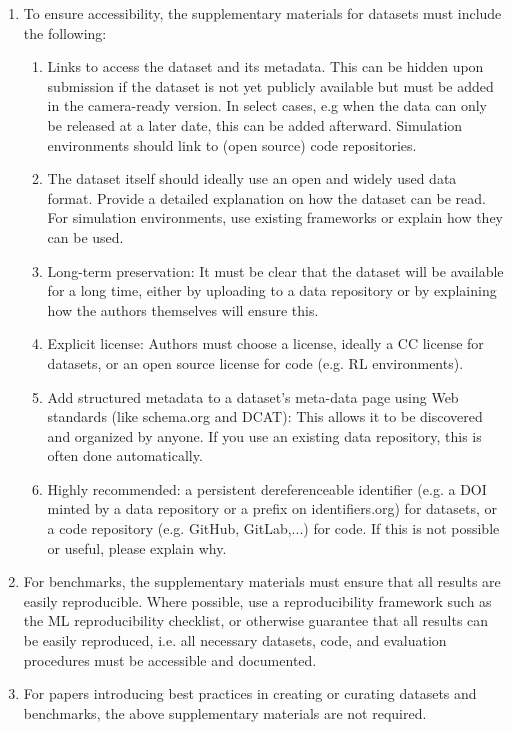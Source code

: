 \begin{enumerate}
\item To ensure accessibility, the supplementary materials for datasets must include the following:
\begin{enumerate}
  \item Links to access the dataset and its metadata. This can be hidden upon submission if the dataset is not yet publicly available but must be added in the camera-ready version. In select cases, e.g when the data can only be released at a later date, this can be added afterward. Simulation environments should link to (open source) code repositories.
  \item The dataset itself should ideally use an open and widely used data format. Provide a detailed explanation on how the dataset can be read. For simulation environments, use existing frameworks or explain how they can be used.
  \item Long-term preservation: It must be clear that the dataset will be available for a long time, either by uploading to a data repository or by explaining how the authors themselves will ensure this.
  \item Explicit license: Authors must choose a license, ideally a CC license for datasets, or an open source license for code (e.g. RL environments).
  \item Add structured metadata to a dataset's meta-data page using Web standards (like schema.org and DCAT): This allows it to be discovered and organized by anyone. If you use an existing data repository, this is often done automatically.
  \item Highly recommended: a persistent dereferenceable identifier (e.g. a DOI minted by a data repository or a prefix on identifiers.org) for datasets, or a code repository (e.g. GitHub, GitLab,...) for code. If this is not possible or useful, please explain why.
\end{enumerate}

\item For benchmarks, the supplementary materials must ensure that all results are easily reproducible. Where possible, use a reproducibility framework such as the ML reproducibility checklist, or otherwise guarantee that all results can be easily reproduced, i.e. all necessary datasets, code, and evaluation procedures must be accessible and documented.

\item For papers introducing best practices in creating or curating datasets and benchmarks, the above supplementary materials are not required.
\end{enumerate}
